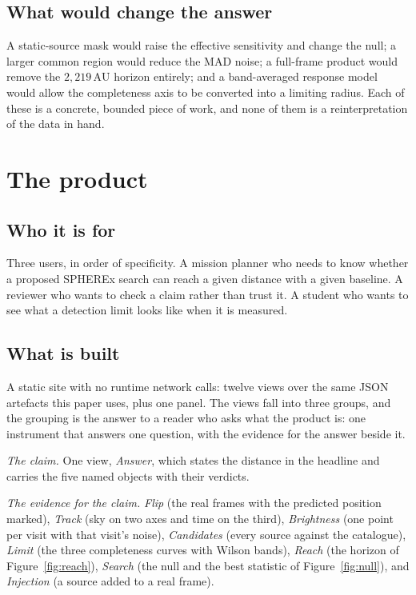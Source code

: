 \documentclass[11pt,a4paper]{article}
\newcommand{\unit}[1]{\,\mathrm{#1}}
\newcommand{\au}{\unit{AU}}
\begin{document}
\subsection{What would change the answer}
A static-source mask would raise the effective sensitivity and change the null; a
larger common region would reduce the MAD noise; a full-frame product would remove
the $2{,}219\au$ horizon entirely; and a band-averaged response model would allow
the completeness axis to be converted into a limiting radius. Each of these is a
concrete, bounded piece of work, and none of them is a reinterpretation of the
data in hand.

\section{The product}\label{sec:product}

\subsection{Who it is for}
Three users, in order of specificity. A mission planner who needs to know whether
a proposed SPHEREx search can reach a given distance with a given baseline. A
reviewer who wants to check a claim rather than trust it. A student who wants to
see what a detection limit looks like when it is measured.

\subsection{What is built}
A static site with no runtime network calls: twelve views over the same JSON
artefacts this paper uses, plus one panel. The views fall into three groups, and
the grouping is the answer to a reader who asks what the product is: one
instrument that answers one question, with the evidence for the answer beside it.

\emph{The claim.} One view, \emph{Answer}, which states the distance in the
headline and carries the five named objects with their verdicts.

\emph{The evidence for the claim.} \emph{Flip} (the real frames with the predicted
position marked), \emph{Track} (sky on two axes and time on the third),
\emph{Brightness} (one point per visit with that visit's noise),
\emph{Candidates} (every source against the catalogue), \emph{Limit} (the three
completeness curves with Wilson bands), \emph{Reach} (the horizon of
Figure~\ref{fig:reach}), \emph{Search} (the null and the best statistic of
Figure~\ref{fig:null}), and \emph{Injection} (a source added to a real frame).
\end{document}
